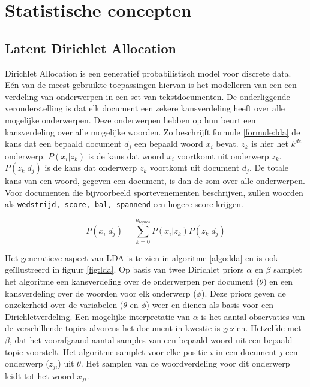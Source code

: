 \section{Statistische concepten}

\subsection{Latent Dirichlet Allocation}
Dirichlet Allocation\cite{Blei2012} is een generatief probabilistisch model voor discrete data. E\'en van de meest gebruikte toepassingen hiervan is het modelleren van een een verdeling van onderwerpen in een set van tekstdocumenten. De onderliggende veronderstelling is dat elk document een zekere kansverdeling heeft over alle mogelijke onderwerpen. Deze onderwerpen hebben op hun beurt een kansverdeling over alle mogelijke woorden. Zo beschrijft formule \eqref{formule:lda} de kans dat een bepaald document $d_j$ een bepaald woord $x_i$ bevat. $z_k$ is hier het $k^{de}$ onderwerp. $P(x_i|z_k)$ is de kans dat woord $x_i$ voortkomt uit onderwerp $z_k$. $P(z_k|d_j)$ is de kans dat onderwerp $z_k$ voortkomt uit document $d_j$. De totale kans van een woord, gegeven een document, is dan de som over alle onderwerpen. Voor documenten die bijvoorbeeld sportevenementen beschrijven, zullen woorden als \texttt{wedstrijd, score, bal, spannend} een hogere score krijgen.

\begin{equation}
P(x_i | d_j) = \sum\limits_{k=0}^{n_{topics}}P(x_i|z_k)P(z_k|d_j)
\label{formule:lda}
\end{equation}

Het generatieve aspect van LDA is te zien in algoritme \ref{algo:lda} en is ook ge\"illustreerd in figuur \ref{fig:lda}. Op basis van twee Dirichlet priors $\alpha$ en $\beta$ samplet het algoritme een kansverdeling over de onderwerpen per document ($\theta$) en een kansverdeling over de woorden voor elk onderwerp ($\phi$). Deze priors geven de onzekerheid over de variabelen ($\theta$ en $\phi$) weer en dienen als basis voor een Dirichletverdeling\cite{Huang2005}. Een mogelijke interpretatie van $\alpha$ is het aantal observaties van de verschillende topics alvorens het document in kwestie is gezien. Hetzelfde met $\beta$, dat het voorafgaand aantal samples van een bepaald woord uit een bepaald topic voorstelt. Het algoritme samplet voor elke positie $i$ in een document $j$ een onderwerp ($z_{ji}$) uit $\theta$. Het samplen van de woordverdeling voor dit onderwerp leidt tot het woord $x_{ji}$\cite{LDAsien}.

